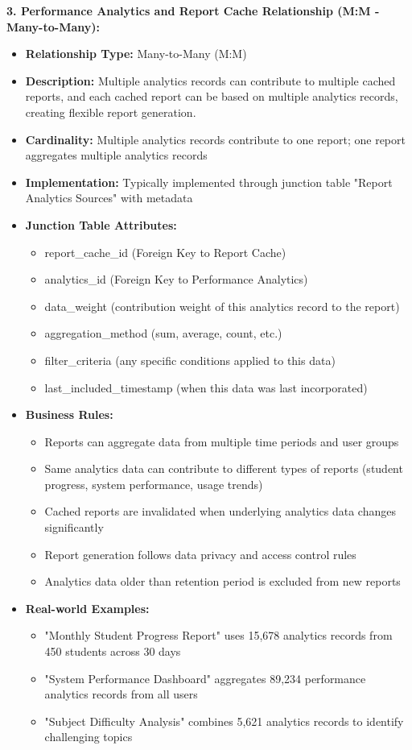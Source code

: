 \documentclass[12pt,a4paper,oneside]{book}
\begin{document}
\textbf{3. Performance Analytics and Report Cache Relationship (M:M - Many-to-Many):}
\begin{itemize}
    \item \textbf{Relationship Type:} Many-to-Many (M:M)
    \item \textbf{Description:} Multiple analytics records can contribute to multiple cached reports, and each cached report can be based on multiple analytics records, creating flexible report generation.
    \item \textbf{Cardinality:} Multiple analytics records contribute to one report; one report aggregates multiple analytics records
    \item \textbf{Implementation:} Typically implemented through junction table "Report Analytics Sources" with metadata
    \item \textbf{Junction Table Attributes:}
        \begin{itemize}
            \item report\_cache\_id (Foreign Key to Report Cache)
            \item analytics\_id (Foreign Key to Performance Analytics)
            \item data\_weight (contribution weight of this analytics record to the report)
            \item aggregation\_method (sum, average, count, etc.)
            \item filter\_criteria (any specific conditions applied to this data)
            \item last\_included\_timestamp (when this data was last incorporated)
        \end{itemize}
    \item \textbf{Business Rules:}
        \begin{itemize}
            \item Reports can aggregate data from multiple time periods and user groups
            \item Same analytics data can contribute to different types of reports (student progress, system performance, usage trends)
            \item Cached reports are invalidated when underlying analytics data changes significantly
            \item Report generation follows data privacy and access control rules
            \item Analytics data older than retention period is excluded from new reports
        \end{itemize}
    \item \textbf{Real-world Examples:}
        \begin{itemize}
            \item "Monthly Student Progress Report" uses 15,678 analytics records from 450 students across 30 days
            \item "System Performance Dashboard" aggregates 89,234 performance analytics records from all users
            \item "Subject Difficulty Analysis" combines 5,621 analytics records to identify challenging topics
        \end{itemize}
\end{itemize}
\end{document}
